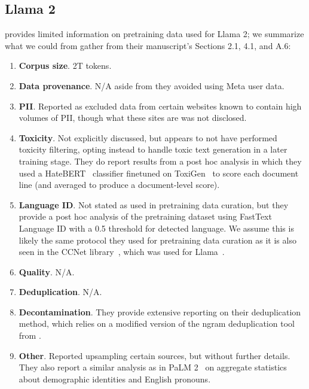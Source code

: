 \documentclass{article}
\begin{document}
\subsection{Llama 2~\citep{Touvron2023Llama2O}}\label{appendix:llm:llama2} 

\citet{Touvron2023Llama2O} provides limited information on pretraining data used for Llama 2; we summarize what we could from gather from their manuscript's Sections 2.1, 4.1, and A.6:

\begin{enumerate}
    \item \textbf{Corpus size}. 2T tokens.
    \item \textbf{Data provenance}. N/A aside from they avoided using Meta user data.
    \item \textbf{PII}. Reported as excluded data from certain websites known to contain high volumes of PII, though what these sites are was not disclosed.
    \item \textbf{Toxicity}. Not explicitly discussed, but appears to not have performed toxicity filtering, opting instead to handle toxic text generation in a later training stage. They do report results from a post hoc analysis in which they used a HateBERT~\citep{caselli-etal-2021-hatebert} classifier finetuned on ToxiGen~\citep{hartvigsen-etal-2022-toxigen} to score each document line (and averaged to produce a document-level score).
    \item \textbf{Language ID}. Not stated as used in pretraining data curation, but they provide a post hoc analysis of the pretraining dataset using FastText Language ID with a 0.5 threshold for detected language. We assume this is likely the same protocol they used for pretraining data curation as it is also seen in the CCNet library~\citep{wenzek-etal-2020-ccnet}, which was used for Llama~\citep{Touvron2023LLaMAOA}.
    \item \textbf{Quality}. N/A.
    \item \textbf{Deduplication}. N/A.
    \item \textbf{Decontamination}. They provide extensive reporting on their deduplication method, which relies on a modified version of the ngram deduplication tool from \citet{lee-etal-2022-deduplicating}.
    \item \textbf{Other}. Reported upsampling certain sources, but without further details. They also report a similar analysis as in PaLM 2~\citep{Anil2023PaLM2T} on aggregate statistics about demographic identities and English pronouns.
\end{enumerate}
\end{document}
